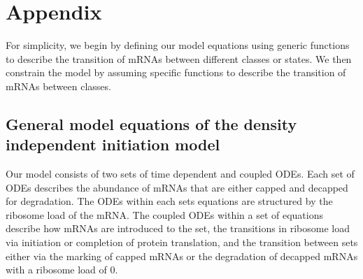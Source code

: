 \documentclass[review]{elsarticle}
\begin{document}


	

%


 


\section{Appendix}

For simplicity, we begin by defining our model equations using generic functions to describe the transition of mRNAs between different classes or states.
We then constrain the model by assuming specific functions to describe the transition of mRNAs between classes.

\subsection*{General model equations of the density independent initiation model}
Our model consists of two sets of time dependent and coupled ODEs.
Each set of ODEs describes the abundance of mRNAs that are either capped and decapped for degradation.
The ODEs within each sets equations are structured by the ribosome load of the mRNA.
The coupled ODEs within a set of equations describe how mRNAs are introduced to the set, the transitions in ribosome load via initiation or completion of protein translation,  and the transition between sets either via the marking of capped mRNAs or the degradation of decapped mRNAs with a ribosome load of 0.
\end{document}
